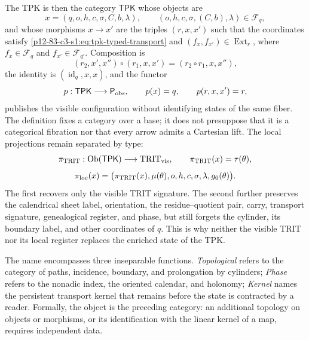The TPK is then the category \(\mathsf{TPK}\) whose objects are
\begin{equation}
x=(q,o,h,c,\sigma,C,b,\lambda),
\qquad (o,h,c,\sigma,(C,b),\lambda)\in\mathcal F_q,
\label{p12-83-c3-s1:eq:tpk-enriched-object}
\end{equation}
and whose morphisms \(x\to x'\) are the triples \((r,x,x')\) such that
the coordinates satisfy \eqref{p12-83-c3-s1:eq:tpk-typed-transport} and
\((f_x,f_{x'})\in\operatorname{Ext}_r\), where
\(f_x\in\mathcal F_q\) and \(f_{x'}\in\mathcal F_{q'}\). Composition is
\begin{equation}
(r_2,x',x'')\circ(r_1,x,x')
=(r_2\circ r_1,x,x''),
\label{p12-83-c3-s1:eq:tpk-morphism-composition}
\end{equation}
the identity is \((\operatorname{id}_q,x,x)\), and the functor
\begin{equation}
p:\mathsf{TPK}\longrightarrow\mathsf P_{\rm obs},
\qquad p(x)=q,
\qquad p(r,x,x')=r,
\label{p12-83-c3-s1:eq:tpk-base-functor}
\end{equation}
publishes the visible configuration without identifying states of the same fiber.
The definition fixes a category over a base; it does not presuppose that it is a
categorical fibration nor that every arrow admits a Cartesian lift.
The local projections remain separated by type:
\[
\pi_{\rm TRIT}:\operatorname{Ob}(\mathsf{TPK})
\longrightarrow\mathrm{TRIT}_{\rm vis},
\qquad
\pi_{\rm TRIT}(x)=\tau(\theta),
\]
\[
\pi_{\rm loc}(x)=
\bigl(\pi_{\rm TRIT}(x),\mu(\theta),o,h,c,
\sigma,\lambda,g_0(\theta)\bigr).
\]
The first recovers only the visible TRIT signature. The second further preserves
the calendrical sheet label, orientation, the residue--quotient pair,
carry, transport signature, genealogical register, and phase,
but still forgets the cylinder, its boundary label, and other coordinates of
\(q\). This is why neither the visible TRIT nor its local register
replaces the enriched state of the TPK.

The name encompasses three inseparable functions. \emph{Topological} refers to
the category of paths, incidence, boundary, and prolongation by
cylinders; \emph{Phase} refers to the nonadic index, the oriented calendar, and
holonomy; \emph{Kernel} names the persistent transport kernel that
remains before the state is contracted by a reader. Formally, the
object is the preceding category: an additional topology on objects or
morphisms, or its identification with the linear kernel of a map, requires
independent data.

